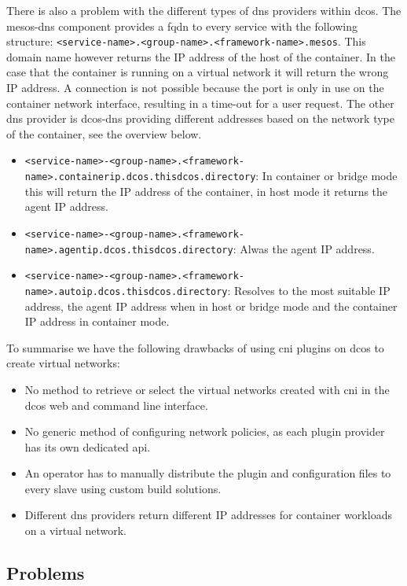 There is also a problem with the different types of \gls{dns} providers within \gls{dcos}. The mesos-dns component provides a \gls{fqdn} to every service with the following structure: \texttt{<service-name>.<group-name>.<framework-name>.mesos}. This domain name however returns the IP address of the host of the container. In the case that the container is running on a virtual network it will return the wrong IP address. A connection is not possible because the port is only in use on the container network interface, resulting in a time-out for a user request. The other \gls{dns} provider is dcos-dns providing different addresses based on the network type of the container, see the overview below.
\begin{itemize}
    \item \texttt{<service-name>-<group-name>.<framework-name>.containerip.dcos.thisdcos.directory}: In container or bridge mode this will return the IP address of the container, in host mode it returns the agent IP address.
    \item \texttt{<service-name>-<group-name>.<framework-name>.agentip.dcos.thisdcos.directory}: Alwas the agent IP address.
    \item \texttt{<service-name>-<group-name>.<framework-name>.autoip.dcos.thisdcos.directory}: Resolves to the most suitable IP address, the agent IP address when in host or bridge mode and the container IP address in container mode.
\end{itemize}

To summarise we have the following drawbacks of using \gls{cni} plugins on \gls{dcos} to create virtual networks:
\begin{itemize}
    \item No method to retrieve or select the virtual networks created with \gls{cni} in the \gls{dcos} web and command line interface.
    \item No generic method of configuring network policies, as each plugin provider has its own dedicated \gls{api}.
    \item An operator has to manually distribute the plugin and configuration files to every slave using custom build solutions.
    \item Different \gls{dns} providers return different IP addresses for container workloads on a virtual network.
\end{itemize}

\subsection{Problems}
\label{subsec:problems}

